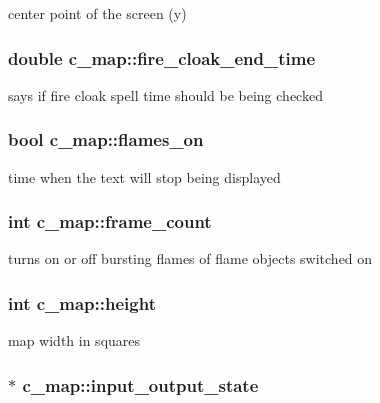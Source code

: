 center point of the screen (y) \hypertarget{classc__map_a38c8548138806d350a13fc6ace496d14}{
\subsubsection[{fire\-\_\-cloak\-\_\-end\-\_\-time}]{\setlength{\rightskip}{0pt plus 5cm}double c\-\_\-map\-::fire\-\_\-cloak\-\_\-end\-\_\-time\hspace{0.3cm}{\ttfamily [protected]}}}\label{classc__map_a38c8548138806d350a13fc6ace496d14}
says if fire cloak spell time should be being checked \hypertarget{classc__map_a42c18f1bd057c4dcd88ec2de95c854fe}{
\subsubsection[{flames\-\_\-on}]{\setlength{\rightskip}{0pt plus 5cm}bool c\-\_\-map\-::flames\-\_\-on\hspace{0.3cm}{\ttfamily [protected]}}}\label{classc__map_a42c18f1bd057c4dcd88ec2de95c854fe}
time when the text will stop being displayed \hypertarget{classc__map_ae7f6ee0b7e9f43cf0344d55480595803}{
\subsubsection[{frame\-\_\-count}]{\setlength{\rightskip}{0pt plus 5cm}int c\-\_\-map\-::frame\-\_\-count\hspace{0.3cm}{\ttfamily [protected]}}}\label{classc__map_ae7f6ee0b7e9f43cf0344d55480595803}
turns on or off bursting flames of flame objects switched on \hypertarget{classc__map_af30ddc07f94cbc2e9c91cbdfd3f68cc5}{
\subsubsection[{height}]{\setlength{\rightskip}{0pt plus 5cm}int c\-\_\-map\-::height\hspace{0.3cm}{\ttfamily [protected]}}}\label{classc__map_af30ddc07f94cbc2e9c91cbdfd3f68cc5}
map width in squares \hypertarget{classc__map_a548cfcecd3a9981dc3c4dd950ceaeab4}{
\subsubsection[{input\-\_\-output\-\_\-state}]{$\ast$ c\-\_\-map\-::input\-\_\-output\-\_\-state\hspace{0.3cm}{\ttfamily [protected]}}}\label{classc__map_a548cfcecd3a9981dc3c4dd950ceaeab4}
